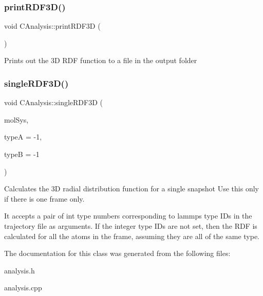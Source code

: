 \subsubsection{\texorpdfstring{print\+R\+D\+F3\+D()}{printRDF3D()}}
{\footnotesize\ttfamily void C\+Analysis\+::print\+R\+D\+F3D (\begin{DoxyParamCaption}{ }\end{DoxyParamCaption})}

Prints out the 3D R\+DF function to a file in the output folder \mbox{\label{classCAnalysis_ab3566f13bda907427f28c82706ac3aec}} 
\subsubsection{\texorpdfstring{single\+R\+D\+F3\+D()}{singleRDF3D()}}
{\footnotesize\ttfamily void C\+Analysis\+::single\+R\+D\+F3D (\begin{DoxyParamCaption}\item[{class \mbox{\hyperlink{classCMolecularSystem}{C\+Molecular\+System}} \&}]{mol\+Sys,  }\item[{int}]{typeA = {\ttfamily -\/1},  }\item[{int}]{typeB = {\ttfamily -\/1} }\end{DoxyParamCaption})}

Calculates the 3D radial distribution function for a single snapshot Use this only if there is one frame only.

It accepts a pair of int type numbers corresponding to lammps type I\+Ds in the trajectory file as arguments. If the integer type I\+Ds are not set, then the R\+DF is calculated for all the atoms in the frame, assuming they are all of the same type. 

The documentation for this class was generated from the following files\+:\begin{DoxyCompactItemize}
\item 
analysis.\+h\item 
analysis.\+cpp\end{DoxyCompactItemize}
